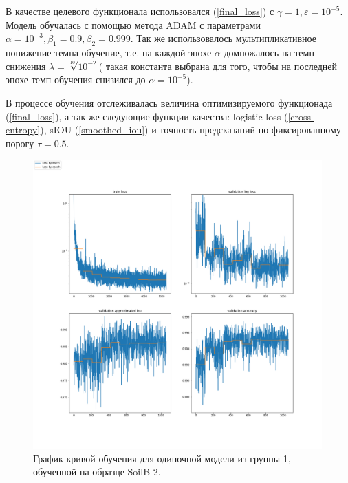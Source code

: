 \documentclass[12pt, a4paper]{extarticle}
\begin{document}
В качестве целевого функционала использовался (\ref{final_loss}) с 
$\gamma=1, \varepsilon=10^{-5}$. Модель обучалась с помощью метода 
ADAM \cite{19} с параметрами \\
$\alpha=10^{-3}, \beta_1=0.9, \beta_2=0.999$. Так же использовалось 
мультипликативное понижение темпа обучение, т.е. на каждой эпохе 
$\alpha$ домножалось на темп снижения $\lambda=\sqrt[10]{10^{-2}}$( такая константа выбрана для того, чтобы на последней эпохе темп обучения снизился до $\alpha=10^{-5}$).

В процессе обучения отслеживалась величина оптимизируемого функционада (\ref{final_loss}), а так же следующие функции качества:
logistic loss (\ref{cross-entropy}), sIOU (\ref{smoothed_iou}) и 
точность предсказаний по фиксированному порогу $\tau=0.5$. 

\begin{figure}[h!]
\includegraphics[width=0.99\textwidth]{data/images/learning_progress_SoilB-2.png}
\caption{График кривой обучения для одиночной модели из группы 1, обученной на образце SoilB-2.}
\label{learning1}
\end{figure}
\end{document}
